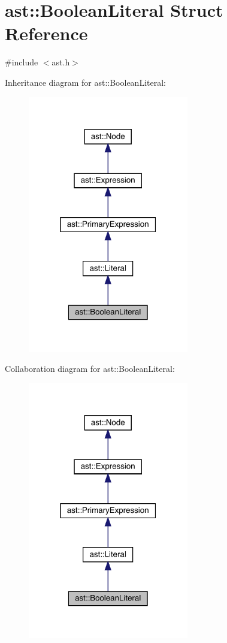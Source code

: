\hypertarget{structast_1_1_boolean_literal}{}\section{ast\+:\+:Boolean\+Literal Struct Reference}
\label{structast_1_1_boolean_literal}


{\ttfamily \#include $<$ast.\+h$>$}



Inheritance diagram for ast\+:\+:Boolean\+Literal\+:\nopagebreak
\begin{figure}[H]
\begin{center}
\leavevmode
\includegraphics[width=199pt]{structast_1_1_boolean_literal__inherit__graph}
\end{center}
\end{figure}


Collaboration diagram for ast\+:\+:Boolean\+Literal\+:\nopagebreak
\begin{figure}[H]
\begin{center}
\leavevmode
\includegraphics[width=199pt]{structast_1_1_boolean_literal__coll__graph}
\end{center}
\end{figure}
